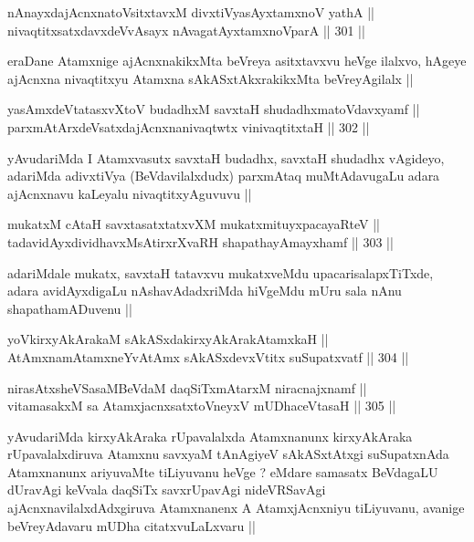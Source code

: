 \begin{shl}
nAnayxdajAcnxnatoV\s sitxtavxM divxtiVyasAyx\s \s tamxnoV yathA || \\
nivaqtitxsatxdavxdeVvAsayx nAvagatAyxtamxnoV\s parA ||  301 ||  
\end{shl}

\begin{artha}
eraDane Atamxnige ajAcnxnakikxMta beVreya asitxtavxvu heVge ilalxvo,
hAgeye ajAcnxna nivaqtitxyu Atamxna sAkASxtAkxrakikxMta beVreyAgilalx ||
\end{artha}

\begin{shl}
yasAmxdeVtatasxvXtoV budadhxM savxtaH shudadhxmatoV\s davxyamf || \\
parxmAtArxdeVsatxdajAcnxnanivaqtwtx vinivaqtitxtaH ||  302 || 
\end{shl}

\begin{artha}
yAvudariMda I Atamxvasutx savxtaH budadhx, savxtaH shudadhx vAgideyo,
adariMda adivxtiVya (BeVdavilalxdudx) parxmAtaq muMtAdavugaLu adara
ajAcnxnavu kaLeyalu nivaqtitxyAguvuvu ||
\end{artha}

\begin{shl}
mukatxM cAtaH savxtasatxtatxvXM mukatxmituyxpacayaRteV || \\
tadavidAyxdividhavxMsAtirxrXvaRH shapathayAmayxhamf ||  303 ||  
\end{shl}

\begin{artha}
adariMdale mukatx, savxtaH tatavxvu mukatxveMdu upacarisalapxTiTxde,
adara avidAyxdigaLu nAshavAdadxriMda hiVgeMdu mUru sala nAnu
shapathamADuvenu ||
\end{artha}

\begin{shl}
yoV\s kirxyAkArakaM sAkASxdakirxyAkArakAtamxkaH || \\
AtAmxnamAtamxneYvA\s \s tAmx sAkASxdevxVtitx suSupatxvatf ||  304 ||  
\end{shl}
				
\begin{shl}
nirasAtxsheVSasaMBeVdaM daqSiTxmAtarxM niracnajxnamf || \\
vitamasakxM sa AtamxjacnxsatxtoV\s neyxV mUDhaceVtasaH ||  305 ||  
\end{shl}

\begin{artha}
yAvudariMda kirxyAkAraka rUpavalalxda Atamxnanunx kirxyAkAraka
rUpavalalxdiruva Atamxnu savxyaM tAnAgiyeV sAkASxtAtxgi suSupatxnAda
Atamxnanunx ariyuvaMte tiLiyuvanu heVge ? eMdare samasatx BeVdagaLU
dUravAgi keVvala daqSiTx savxrUpavAgi nideVRSavAgi
ajAcnxnavilalxdAdxgiruva Atamxnanenx A AtamxjAcnxniyu tiLiyuvanu,
avanige beVreyAdavaru mUDha citatxvuLaLxvaru ||
\end{artha}

